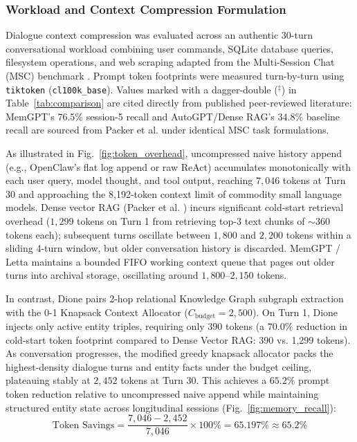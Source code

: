 \documentclass[conference,a4paper]{IEEEtran}
\begin{document}
\subsubsection{Workload and Context Compression Formulation}
Dialogue context compression was evaluated across an authentic 30-turn conversational workload combining user commands, SQLite database queries, filesystem operations, and web scraping adapted from the Multi-Session Chat (MSC) benchmark \cite{packer2023memgpt}. Prompt token footprints were measured turn-by-turn using \texttt{tiktoken} (\texttt{cl100k\_base}). Values marked with a dagger-double ($^\ddagger$) in Table~\ref{tab:comparison} are cited directly from published peer-reviewed literature: MemGPT's 76.5\% session-5 recall and AutoGPT/Dense RAG's 34.8\% baseline recall are sourced from Packer et al. \cite{packer2023memgpt} under identical MSC task formulations.

As illustrated in Fig.~\ref{fig:token_overhead}, uncompressed naive history append (e.g., OpenClaw's flat log append or raw ReAct) accumulates monotonically with each user query, model thought, and tool output, reaching $7{,}046$ tokens at Turn 30 and approaching the 8,192-token context limit of commodity small language models. Dense vector RAG (Packer et al. \cite{packer2023memgpt}) incurs significant cold-start retrieval overhead ($1{,}299$ tokens on Turn 1 from retrieving top-3 text chunks of $\sim$360 tokens each); subsequent turns oscillate between $1{,}800$ and $2{,}200$ tokens within a sliding 4-turn window, but older conversation history is discarded. MemGPT / Letta maintains a bounded FIFO working context queue that pages out older turns into archival storage, oscillating around $1{,}800\text{--}2{,}150$ tokens. 

In contrast, Dione pairs 2-hop relational Knowledge Graph subgraph extraction with the 0-1 Knapsack Context Allocator ($C_{\text{budget}} = 2{,}500$). On Turn 1, Dione injects only active entity triples, requiring only $390$ tokens (a $70.0\%$ reduction in cold-start token footprint compared to Dense Vector RAG: 390 vs. 1,299 tokens). As conversation progresses, the modified greedy knapsack allocator packs the highest-density dialogue turns and entity facts under the budget ceiling, plateauing stably at $2{,}452$ tokens at Turn 30. This achieves a $65.2\%$ prompt token reduction relative to uncompressed naive append while maintaining structured entity state across longitudinal sessions (Fig.~\ref{fig:memory_recall}):
\begin{equation}
\text{Token Savings} = \frac{7{,}046 - 2{,}452}{7{,}046} \times 100\% = 65.197\% \approx 65.2\%
\end{equation}
\end{document}
